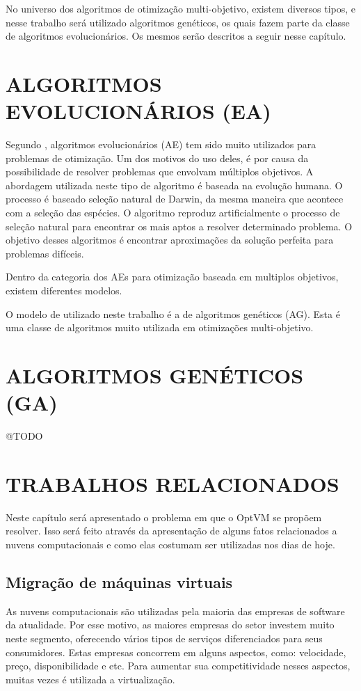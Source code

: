 No universo dos algoritmos de otimização multi-objetivo, existem diversos tipos, e nesse trabalho
será utilizado algoritmos genéticos, os quais fazem parte da classe de algoritmos evolucionários.
Os mesmos serão descritos a seguir nesse capítulo.
 
\section{ALGORITMOS EVOLUCIONÁRIOS (EA)}
Segundo \cite{ticona}, algoritmos evolucionários (AE) tem sido muito utilizados para problemas de 
otimização. Um dos motivos do uso deles, é por causa da possibilidade de resolver problemas que 
envolvam múltiplos objetivos. A abordagem utilizada neste tipo de algoritmo é baseada na 
evolução humana. O processo é baseado seleção natural de Darwin, da mesma maneira que acontece com a 
seleção das espécies. O algoritmo reproduz artificialmente o processo de seleção natural para 
encontrar os mais aptos a resolver determinado problema. O objetivo desses algoritmos é 
encontrar aproximações da solução perfeita para problemas difíceis. 

Dentro da categoria dos AEs para otimização baseada em multiplos objetivos, existem diferentes modelos. 

O modelo de utilizado neste trabalho é a de algoritmos genéticos (AG). Esta é uma classe de 
algoritmos muito utilizada em otimizações multi-objetivo. 

\section{ALGORITMOS GENÉTICOS (GA)}
@TODO

\section{TRABALHOS RELACIONADOS}
Neste capítulo será apresentado o problema em que o OptVM se propõem resolver. 
Isso será feito através da apresentação de alguns fatos relacionados a nuvens computacionais 
e como elas costumam ser utilizadas nos dias de hoje.

\subsection{Migração de máquinas virtuais}
As nuvens computacionais são utilizadas pela maioria das empresas de software da atualidade. 
Por esse motivo, as maiores empresas do setor investem muito neste segmento, 
oferecendo vários tipos de serviços diferenciados para seus consumidores. 
Estas empresas concorrem em alguns aspectos, como: velocidade, preço, disponibilidade e etc. 
Para aumentar sua competitividade nesses aspectos, muitas vezes é utilizada a virtualização.

